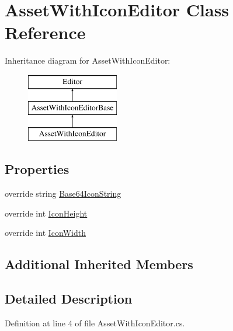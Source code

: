 \hypertarget{class_asset_with_icon_editor}{}\section{Asset\+With\+Icon\+Editor Class Reference}
\label{class_asset_with_icon_editor}
Inheritance diagram for Asset\+With\+Icon\+Editor\+:\begin{figure}[H]
\begin{center}
\leavevmode
\includegraphics[height=3.000000cm]{class_asset_with_icon_editor}
\end{center}
\end{figure}
\subsection*{Properties}
\begin{DoxyCompactItemize}
\item 
override string \mbox{\hyperlink{class_asset_with_icon_editor_aea5c36bd81f9821e486d43aa2569a2eb}{Base64\+Icon\+String}}
\item 
override int \mbox{\hyperlink{class_asset_with_icon_editor_a9b66213f74bd548cf96e6a1e5cf149cd}{Icon\+Height}}
\item 
override int \mbox{\hyperlink{class_asset_with_icon_editor_a4f7bf2614cc56c455424670085c59b33}{Icon\+Width}}
\end{DoxyCompactItemize}
\subsection*{Additional Inherited Members}


\subsection{Detailed Description}


Definition at line 4 of file Asset\+With\+Icon\+Editor.\+cs.



